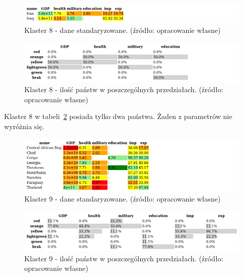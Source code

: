 \documentclass[11pt]{report}
\begin{document}
    \begin{figure}[!htp]
        \centering
        \includegraphics[width=1 \textwidth]{tables/CLUST/cluster8stdkmeans.png}
        \caption{Klaster 8 - dane standaryzowane. (źródło: opracowanie własne)}
        \label{tab:cl8std}
    \end{figure}

    \begin{figure}[!htp]
        \centering
        \includegraphics[width=1 \textwidth]{tables/CLUST/cluster8stdkmeanscount.png}
        \caption{Klaster 8 - ilość państw w poszczególnych przedziałach. (źródło: opracowanie własne)}
        \label{tab:cl8stdcount}
    \end{figure}

    Klaster 8 w tabeli~\ref{tab:cl8stdcount} posiada tylko dwa państwa.
    Żaden z parametrów nie wyróżnia się.

    

    \begin{figure}[!htp]
        \centering
        \includegraphics[width=1 \textwidth]{tables/CLUST/cluster9stdkmeans.png}
        \caption{Klaster 9 - dane standaryzowane. (źródło: opracowanie własne)}
        \label{tab:cl9std}
    \end{figure}

    \begin{figure}[!htp]
        \centering
        \includegraphics[width=1 \textwidth]{tables/CLUST/cluster9stdkmeanscount.png}
        \caption{Klaster 9 - ilość państw w poszczególnych przedziałach. (źródło: opracowanie własne)}
        \label{tab:cl9stdcount}
    \end{figure}
\end{document}
